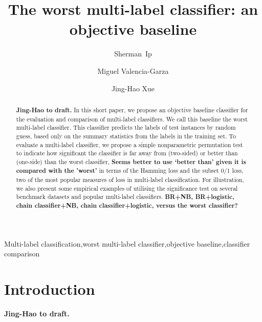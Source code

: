 \documentclass[review]{elsarticle}
\begin{document}
\begin{frontmatter}

\title{The worst multi-label classifier: an objective baseline}

\author[Warwick,UCL]{Sherman~Ip}
\author[UCL]{Miguel Valencia-Garza}
\author[UCL]{Jing-Hao Xue}

\address[Warwick]{Department of Statistics, University of Warwick, Coventry CV4 7AL, UK}
\address[UCL]{Department of Statistical Science, University College London, London WC1E 6BT, UK}

\begin{abstract}
{\bf Jing-Hao to draft.} In this short paper, we propose an objective baseline classifier for the evaluation and comparison of multi-label classifiers.  We call this baseline the worst multi-label classifier.  This classifier predicts the labels of test instances by random guess, based only on the summary statistics from the labels in the training set.  To evaluate a multi-label classifier, we propose a simple nonparametric permutation test to indicate how significant the classifier is far away from (two-sided) or better than (one-side) than the worst classifier, {\bf Seems better to use `better than' given it is compared with the 'worst'} in terms of the Hamming loss and the subset 0/1 loss, two of the most popular measures of loss in multi-label classification.  For illustration, we also present some empirical examples of utilising the significance test on several benchmark datasets and popular multi-label classifiers. {\bf BR+NB, BR+logistic, chain classifier+NB, chain classifier+logistic, versus the worst classifier?}
\end{abstract}

\begin{keyword}
Multi-label classification\sep worst multi-label classifier\sep objective baseline\sep classifier comparison
\end{keyword}

\end{frontmatter}

\linenumbers


\section{Introduction}\label{s:intro}

{\bf Jing-Hao to draft.}
\end{document}
